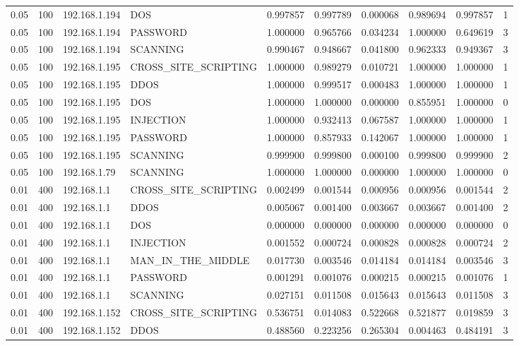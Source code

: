 \begin{tabular}{llllllllll}
0.05 & 100 & 192.168.1.194 & DOS & 0.997857 & 0.997789 & 0.000068 & 0.989694 & 0.997857 & 1 \\
0.05 & 100 & 192.168.1.194 & PASSWORD & 1.000000 & 0.965766 & 0.034234 & 1.000000 & 0.649619 & 3 \\
0.05 & 100 & 192.168.1.194 & SCANNING & 0.990467 & 0.948667 & 0.041800 & 0.962333 & 0.949367 & 3 \\
0.05 & 100 & 192.168.1.195 & CROSS\_SITE\_SCRIPTING & 1.000000 & 0.989279 & 0.010721 & 1.000000 & 1.000000 & 1 \\
0.05 & 100 & 192.168.1.195 & DDOS & 1.000000 & 0.999517 & 0.000483 & 1.000000 & 1.000000 & 1 \\
0.05 & 100 & 192.168.1.195 & DOS & 1.000000 & 1.000000 & 0.000000 & 0.855951 & 1.000000 & 0 \\
0.05 & 100 & 192.168.1.195 & INJECTION & 1.000000 & 0.932413 & 0.067587 & 1.000000 & 1.000000 & 1 \\
0.05 & 100 & 192.168.1.195 & PASSWORD & 1.000000 & 0.857933 & 0.142067 & 1.000000 & 1.000000 & 1 \\
0.05 & 100 & 192.168.1.195 & SCANNING & 0.999900 & 0.999800 & 0.000100 & 0.999800 & 0.999900 & 2 \\
0.05 & 100 & 192.168.1.79 & SCANNING & 1.000000 & 1.000000 & 0.000000 & 1.000000 & 1.000000 & 0 \\
0.01 & 400 & 192.168.1.1 & CROSS\_SITE\_SCRIPTING & 0.002499 & 0.001544 & 0.000956 & 0.000956 & 0.001544 & 2 \\
0.01 & 400 & 192.168.1.1 & DDOS & 0.005067 & 0.001400 & 0.003667 & 0.003667 & 0.001400 & 2 \\
0.01 & 400 & 192.168.1.1 & DOS & 0.000000 & 0.000000 & 0.000000 & 0.000000 & 0.000000 & 0 \\
0.01 & 400 & 192.168.1.1 & INJECTION & 0.001552 & 0.000724 & 0.000828 & 0.000828 & 0.000724 & 2 \\
0.01 & 400 & 192.168.1.1 & MAN\_IN\_THE\_MIDDLE & 0.017730 & 0.003546 & 0.014184 & 0.014184 & 0.003546 & 3 \\
0.01 & 400 & 192.168.1.1 & PASSWORD & 0.001291 & 0.001076 & 0.000215 & 0.000215 & 0.001076 & 1 \\
0.01 & 400 & 192.168.1.1 & SCANNING & 0.027151 & 0.011508 & 0.015643 & 0.015643 & 0.011508 & 3 \\
0.01 & 400 & 192.168.1.152 & CROSS\_SITE\_SCRIPTING & 0.536751 & 0.014083 & 0.522668 & 0.521877 & 0.019859 & 3 \\
0.01 & 400 & 192.168.1.152 & DDOS & 0.488560 & 0.223256 & 0.265304 & 0.004463 & 0.484191 & 3 \\

\end{tabular}
